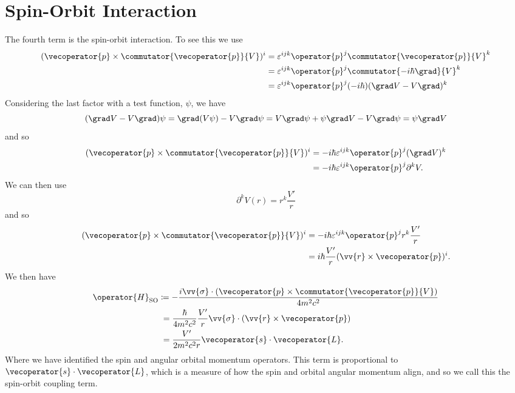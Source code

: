 \documentclass[fleqn]{NotesClass}
\newcommand*{\hamiltonian}{H}
\begin{document}
    \section{Spin-Orbit Interaction}
    The fourth term is the spin-orbit interaction.
    To see this we use
    \begin{align}
        (\vecoperator{p} \times \commutator{\vecoperator{p}}{V})^i &= \varepsilon^{ijk}\operator{p}^j \commutator{\vecoperator{p}}{V}^k\\
        &= \varepsilon^{ijk}\operator{p}^j\commutator{-i\hbar\grad}{V}^k\\
        &= \varepsilon^{ijk}\operator{p}^j(-i\hbar)(\grad V - V\grad)^k
    \end{align}
    Considering the last factor with a test function, \(\psi\), we have
    \begin{equation}
        (\grad V - V\grad)\psi = \grad(V\psi) - V\grad\psi = V\grad \psi + \psi\grad V - V\grad\psi = \psi\grad V
    \end{equation}
    and so
    \begin{align}
        (\vecoperator{p} \times \commutator{\vecoperator{p}}{V})^i &= -i\hbar\varepsilon^{ijk}\operator{p}^j(\grad V)^k\\
        &= -i\hbar\varepsilon^{ijk}\operator{p}^j\partial^k V.
    \end{align}
    We can then use
    \begin{equation}
        \partial^k V(r) = r^k \frac{V'}{r}
    \end{equation}
    and so
    \begin{align}
        (\vecoperator{p} \times \commutator{\vecoperator{p}}{V})^{i} &= -i\hbar\varepsilon^{ijk}\operator{p}^jr^k\frac{V'}{r}\\
        &= i\hbar\frac{V'}{r}(\vv{r} \times \vecoperator{p})^i.
    \end{align}
    We then have
    \begin{align}
        \operator{\hamiltonian}_{\mathrm{SO}} &\coloneqq -\frac{i\vv{\sigma} \cdot (\vecoperator{p} \times \commutator{\vecoperator{p}}{V})}{4m^2c^2}\\
        &\hphantom{:}= \frac{\hbar}{4m^2c^2}\frac{V'}{r}\vv{\sigma} \cdot (\vv{r} \times \vecoperator{p})\\
        &\hphantom{:}= \frac{V'}{2m^2c^2r}\vecoperator{s} \cdot \vecoperator{L}.
    \end{align}
    Where we have identified the spin and angular orbital momentum operators.
    This term is proportional to \(\vecoperator{s}\cdot\vecoperator{L}\), which is a measure of how the spin and orbital angular momentum align, and so we call this the spin-orbit coupling term.
    
\end{document}
